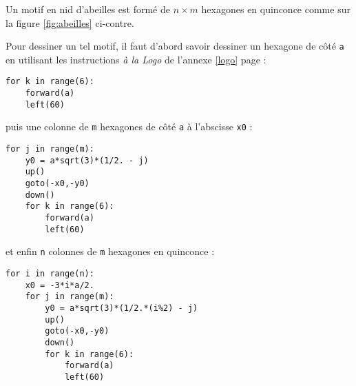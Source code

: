 \begin{ex}\label{ex:abeille}
Un motif en nid d'abeilles est
formé de $n\times m$ hexagones en quinconce comme sur la figure \ref{fig:abeilles}
ci-contre.\\
\end{ex}

\noindent Pour dessiner un tel motif, il faut d'abord savoir dessiner un hexagone de côté {\tt a} 
en utilisant les instructions {\em à la {\sc Logo}} de l'annexe \ref{logo} page \pageref{logo} :

\begin{py}{3cm}
\begin{verbatim}
for k in range(6):
    forward(a)
    left(60)
\end{verbatim}
\end{py}
\vspace*{1mm}

\noindent puis une colonne de {\tt m} hexagones de côté {\tt a} à l'abscisse {\tt x0} :

\begin{py}{3cm}
\begin{verbatim}
for j in range(m):
    y0 = a*sqrt(3)*(1/2. - j)
    up()
    goto(-x0,-y0)
    down()
    for k in range(6):
        forward(a)
        left(60)
\end{verbatim}
\end{py}
\vspace*{1mm}

\noindent et enfin {\tt n} colonnes de {\tt m} hexagones en quinconce :

\begin{py}{3cm}
\begin{verbatim}
for i in range(n):
    x0 = -3*i*a/2.
    for j in range(m):
        y0 = a*sqrt(3)*(1/2.*(i%2) - j)
        up()
        goto(-x0,-y0)
        down()
        for k in range(6):
            forward(a)
            left(60)
\end{verbatim}
\end{py}


